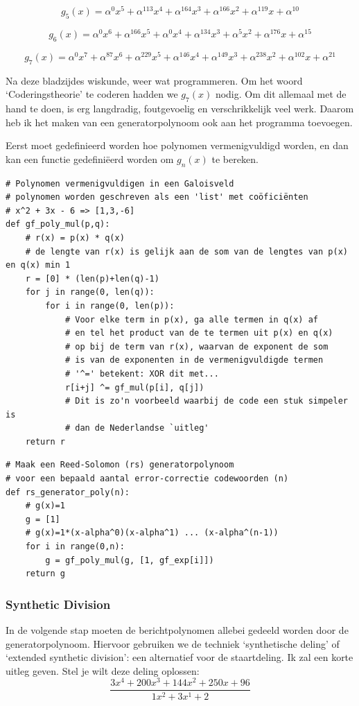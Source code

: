 \documentclass[a4paper]{article}
\begin{document}
$$g_5(x)=\alpha^{0}x^{5}+\alpha^{113}x^{4}+\alpha^{164}x^{3}+\alpha^{166}x^{2}+\alpha^{119}x+\alpha^{10}$$

$$g_6(x)=\alpha^{0}x^{6}+\alpha^{166}x^{5}+\alpha^{0}x^{4}+\alpha^{134}x^{3}+\alpha^{5}x^{2}+\alpha^{176}x+\alpha^{15}$$

$$g_7(x)=\alpha^{0}x^{7}+\alpha^{87}x^{6}+\alpha^{229}x^{5}+\alpha^{146}x^{4}+\alpha^{149}x^{3}+\alpha^{238}x^{2}+\alpha^{102}x+\alpha^{21}$$

Na deze bladzijdes wiskunde, weer wat programmeren. Om het woord `Coderingstheorie' te coderen hadden we $g_7(x)$ nodig. Om dit allemaal met de hand te doen, is erg langdradig, foutgevoelig en verschrikkelijk veel werk. Daarom heb ik het maken van een generatorpolynoom ook aan het programma toevoegen.

Eerst moet gedefinieerd worden hoe polynomen vermenigvuldigd  worden, en dan kan een functie gedefiniëerd worden om $g_n(x)$ te bereken.

\begin{verbatim}
# Polynomen vermenigvuldigen in een Galoisveld
# polynomen worden geschreven als een 'list' met coöficiënten
# x^2 + 3x - 6 => [1,3,-6]
def gf_poly_mul(p,q):
    # r(x) = p(x) * q(x)
    # de lengte van r(x) is gelijk aan de som van de lengtes van p(x) en q(x) min 1
    r = [0] * (len(p)+len(q)-1)
    for j in range(0, len(q)):
        for i in range(0, len(p)):
        	# Voor elke term in p(x), ga alle termen in q(x) af 
            # en tel het product van de te termen uit p(x) en q(x)
            # op bij de term van r(x), waarvan de exponent de som
            # is van de exponenten in de vermenigvuldigde termen
            # '^=' betekent: XOR dit met...
            r[i+j] ^= gf_mul(p[i], q[j])
            # Dit is zo'n voorbeeld waarbij de code een stuk simpeler is
            # dan de Nederlandse `uitleg'
    return r
\end{verbatim}
\begin{verbatim}
# Maak een Reed-Solomon (rs) generatorpolynoom
# voor een bepaald aantal error-correctie codewoorden (n)
def rs_generator_poly(n):
    # g(x)=1
    g = [1]
    # g(x)=1*(x-alpha^0)(x-alpha^1) ... (x-alpha^(n-1))
    for i in range(0,n):
        g = gf_poly_mul(g, [1, gf_exp[i]])
    return g
\end{verbatim}
\subsubsection{Synthetic Division}
In de volgende stap moeten de berichtpolynomen allebei gedeeld worden door de generatorpolynoom. Hiervoor gebruiken we de techniek `synthetische deling' of `extended synthetic division': een alternatief voor de staartdeling. Ik zal een korte uitleg geven. Stel je wilt deze deling oplossen:
$$\frac{
3x^4+200x^3+144x^2+250x+96
}{
1x^2 + 3x^1 + 2
}$$
\end{document}
